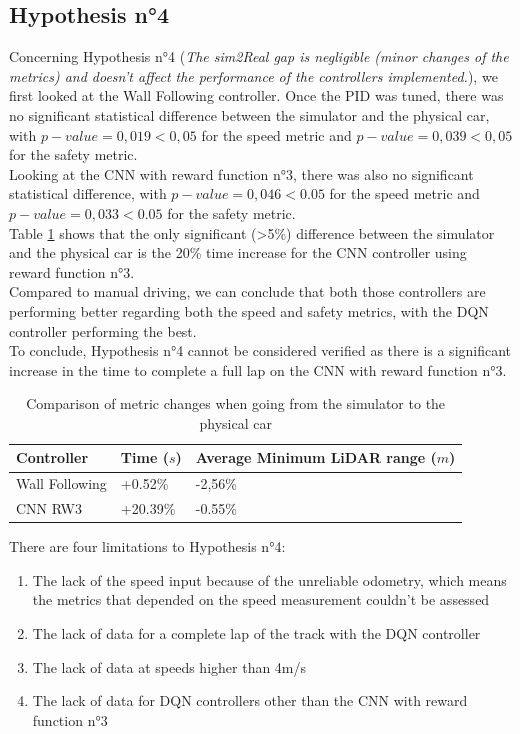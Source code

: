 \subsection{Hypothesis n°4}
Concerning Hypothesis n°4 (\textit{The sim2Real gap is negligible (minor changes of the metrics) and doesn't affect the performance of the controllers implemented.}), we first looked at the Wall Following controller. Once the PID was tuned, there was no significant statistical difference between the simulator and the physical car, with $p-value=0,019<0,05$ for the speed metric and $p-value=0,039<0,05$ for the safety metric. \\
Looking at the CNN with reward function n°3, there was also no significant statistical difference, with $p-value=0,046<0.05$ for the speed metric and $p-value=0,033<0.05$ for the safety metric. \\
Table \ref{h4comparisons} shows that the only significant (>5\%) difference between the simulator and the physical car is the 20\% time increase for the CNN controller using reward function n°3. \\
Compared to manual driving, we can conclude that both those controllers are performing better regarding both the speed and safety metrics, with the DQN controller performing the best. \\
To conclude, Hypothesis n°4 cannot be considered verified as there is a significant increase in the time to complete a full lap on the CNN with reward function n°3.

\begin{table}[H]
\centering
\begin{tabularx}{\textwidth}{||X|X|X||} 
\hline
 Controller & Time ($s$) & Average Minimum LiDAR range ($m$) \\ [0.5ex] 
 \hline\hline
Wall Following & +0.52\% & -2,56\% \\[0.5ex] 
 \hline
CNN RW3 & +20.39\% & -0.55\% \\[0.5ex] 
 \hline
\end{tabularx}
\caption{Comparison of metric changes when going from the simulator to the physical car}
\label{h4comparisons}
\end{table}


There are four limitations to Hypothesis n°4:
\begin{enumerate}
	\item The lack of the speed input because of the unreliable odometry, which means the metrics that depended on the speed measurement couldn't be assessed
	\item The lack of data for a complete lap of the track with the DQN controller
	\item The lack of data at speeds higher than 4m/s
	\item The lack of data for DQN controllers other than the CNN with reward function n°3
\end{enumerate}

